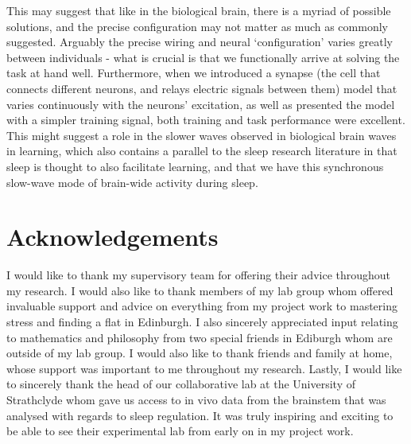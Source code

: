\documentclass[mphil,deptreport,ianc]{infthesis} %
\begin{document}
\begin{preliminary}
This may suggest that like in the biological brain, there is a myriad of possible solutions, and the precise configuration may not matter as much as commonly suggested. Arguably the precise wiring and neural ‘configuration’ varies greatly between individuals - what is crucial is that we functionally arrive at solving the task at hand well.
Furthermore, when we introduced a synapse (the cell that connects different neurons, and relays electric signals between them) model that varies continuously with the neurons’ excitation, as well as presented the model with a simpler training signal, both training and task performance were excellent. This might suggest a role in the slower waves observed in biological brain waves in learning, which also contains a parallel to the sleep research literature in that sleep is thought to also facilitate learning, and that we have this synchronous slow-wave mode of brain-wide activity during sleep.

\clearpage

\section*{Acknowledgements}

I would like to thank my supervisory team for offering their advice throughout my research.
I would also like to thank members of my lab group whom offered invaluable support and advice on everything from my project work to mastering stress and finding a flat in Edinburgh.
I also sincerely appreciated input relating to mathematics and philosophy from two special friends in Ediburgh whom are outside of my lab group.
I would also like to thank friends and family at home, whose support was important to me throughout my research.
Lastly, I would like to sincerely thank the head of our collaborative lab at the University of Strathclyde whom gave us access to in vivo data from the brainstem that was analysed with regards to sleep regulation. It was truly inspiring and exciting to be able to see their experimental lab from early on in my project work.


\end{preliminary}
\end{document}
